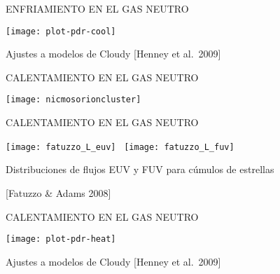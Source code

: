 \documentclass
[
]
{beamer}
\begin{document}
{
\begin{frame}[plain]
\centerline{\large ENFRIAMIENTO EN EL GAS NEUTRO}
\vfill
\centering
\centerline{\texttt{[image: plot-pdr-cool]}}
\vfill
\centerline{Ajustes a modelos de Cloudy [Henney et al.\ 2009]}
\vfill
\end{frame}
}
{
\begin{frame}[plain]
\centerline{\large CALENTAMIENTO EN EL GAS NEUTRO}
\vfill
\centering
\centerline{\texttt{[image: nicmosorioncluster]}}
\end{frame}
}
{
\begin{frame}[plain]
\centerline{\large CALENTAMIENTO EN EL GAS NEUTRO}
\vfill
\centering
\centerline{\texttt{[image: fatuzzo\_L\_euv]}~%
\texttt{[image: fatuzzo\_L\_fuv]}}
\vfill
\centerline{Distribuciones de flujos EUV y FUV para c\'umulos de
  estrellas}
\centerline{[Fatuzzo \& Adams 2008]}
\vfill
\end{frame}
}
{
\begin{frame}[plain]
\centerline{\large CALENTAMIENTO EN EL GAS NEUTRO}
\vfill
\centering
\centerline{\texttt{[image: plot-pdr-heat]}}
\vfill
\centerline{Ajustes a modelos de Cloudy [Henney et al.\ 2009]}
\vfill
\end{frame}
}
\end{document}
